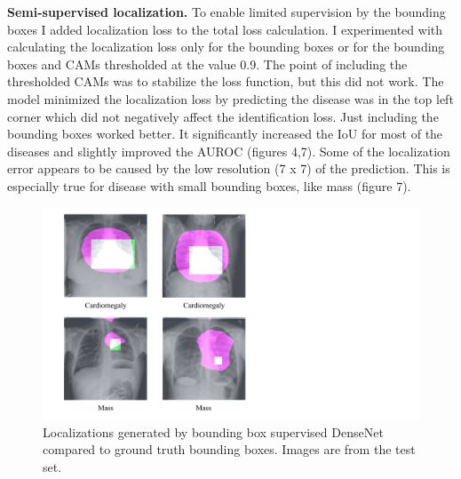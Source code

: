 \documentclass{article}
\begin{document}
{\bf Semi-supervised localization.} To enable limited supervision by the bounding boxes I added localization loss to the total loss calculation. I experimented with calculating the localization loss only for the bounding boxes or for the bounding boxes and CAMs thresholded at the value 0.9. The point of including the thresholded CAMs was to stabilize the loss function, but this did not work. The model minimized the localization loss by predicting the disease was in the top left corner which did not negatively affect the identification loss. Just including the bounding boxes worked better. It significantly increased the IoU for most of the diseases and slightly improved the AUROC (figures 4,7). Some of the localization error appears to be caused by the low resolution (7 x 7) of the prediction. This is especially true for disease with small bounding boxes, like mass (figure 7).

\begin{figure}[p]
\vskip 0.2in
\begin{center}
\centerline{\includegraphics[width=\columnwidth]{figure_7}}
\caption{Localizations generated by bounding box supervised DenseNet compared to ground truth bounding boxes. Images are from the test set.}
\label{figure 7:}
\end{center}
\vskip -0.2in
\end{figure}
\end{document}
